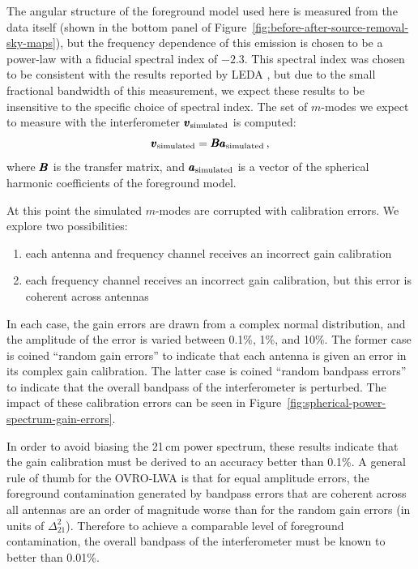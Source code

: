 \begin{bibunit}
The angular structure of the foreground model used here is measured from the data itself (shown in
the bottom panel of Figure~\ref{fig:before-after-source-removal-sky-maps}), but the frequency
dependence of this emission is chosen to be a power-law with a fiducial spectral index of $-2.3$.
This spectral index was chosen to be consistent with the results reported by LEDA
\citep{2018MNRAS.478.4193P}, but due to the small fractional bandwidth of this measurement, we
expect these results to be insensitive to the specific choice of spectral index. The set of
$m$-modes we expect to measure with the interferometer $\pmb v_\text{simulated}$ is computed:
\begin{equation}
    \pmb v_\text{simulated} = \pmb B\pmb a_\text{simulated}\,,
\end{equation}
where $\pmb B$ is the transfer matrix, and $\pmb a_\text{simulated}$ is a vector of the spherical
harmonic coefficients of the foreground model.

At this point the simulated $m$-modes are corrupted with calibration errors. We explore two
possibilities:
\begin{enumerate}
    \item each antenna and frequency channel receives an incorrect gain calibration
    \item each frequency channel receives an incorrect gain calibration, but this error is coherent
        across antennas
\end{enumerate}
In each case, the gain errors are drawn from a complex normal distribution, and the amplitude of the
error is varied between 0.1\%, 1\%, and 10\%. The former case is coined ``random gain errors'' to
indicate that each antenna is given an error in its complex gain calibration. The latter case is
coined ``random bandpass errors'' to indicate that the overall bandpass of the interferometer is
perturbed. The impact of these calibration errors can be seen in
Figure~\ref{fig:spherical-power-spectrum-gain-errors}.

In order to avoid biasing the 21\,cm power spectrum, these results indicate that the gain
calibration must be derived to an accuracy better than 0.1\%.  A general rule of thumb for the
OVRO-LWA is that for equal amplitude errors, the foreground contamination generated by bandpass
errors that are coherent across all antennas are an order of magnitude worse than for the random
gain errors (in units of $\Delta_{21}^2$). Therefore to achieve a comparable level of foreground
contamination, the overall bandpass of the interferometer must be known to better than 0.01\%.


\end{bibunit}

